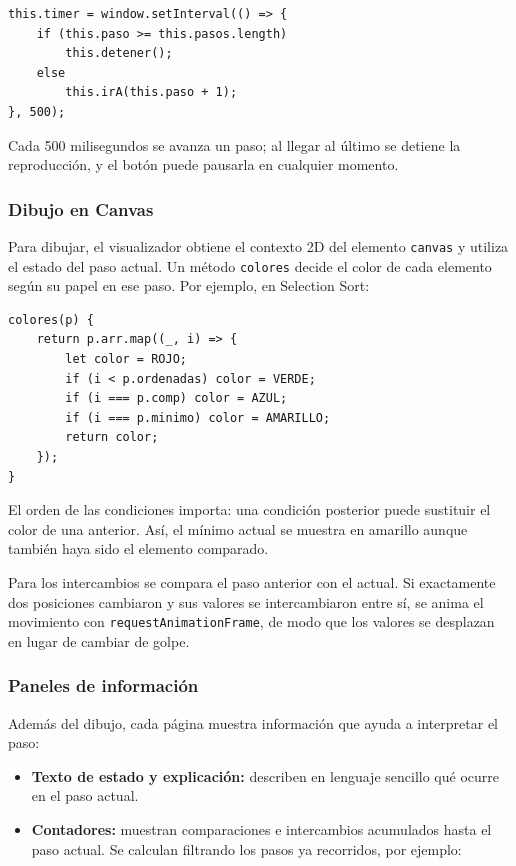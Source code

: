 \documentclass[12pt,a4paper]{article}
\begin{document}
\begin{lstlisting}[caption={Reproducción automática}]
this.timer = window.setInterval(() => {
    if (this.paso >= this.pasos.length)
        this.detener();
    else
        this.irA(this.paso + 1);
}, 500);
\end{lstlisting}

Cada 500 milisegundos se avanza un paso; al llegar al último se detiene la reproducción, y el botón puede pausarla en cualquier momento.

\subsubsection{Dibujo en Canvas}

Para dibujar, el visualizador obtiene el contexto 2D del elemento \texttt{canvas} y utiliza el estado del paso actual. Un método \texttt{colores} decide el color de cada elemento según su papel en ese paso. Por ejemplo, en Selection Sort:

\begin{lstlisting}[caption={Asignación de colores en Selection Sort}]
colores(p) {
    return p.arr.map((_, i) => {
        let color = ROJO;
        if (i < p.ordenadas) color = VERDE;
        if (i === p.comp) color = AZUL;
        if (i === p.minimo) color = AMARILLO;
        return color;
    });
}
\end{lstlisting}

El orden de las condiciones importa: una condición posterior puede sustituir el color de una anterior. Así, el mínimo actual se muestra en amarillo aunque también haya sido el elemento comparado.

Para los intercambios se compara el paso anterior con el actual. Si exactamente dos posiciones cambiaron y sus valores se intercambiaron entre sí, se anima el movimiento con \texttt{requestAnimationFrame}, de modo que los valores se desplazan en lugar de cambiar de golpe.

\subsubsection{Paneles de información}

Además del dibujo, cada página muestra información que ayuda a interpretar el paso:

\begin{itemize}
    \item \textbf{Texto de estado y explicación:} describen en lenguaje sencillo qué ocurre en el paso actual.
    \item \textbf{Contadores:} muestran comparaciones e intercambios acumulados hasta el paso actual. Se calculan filtrando los pasos ya recorridos, por ejemplo:
\end{itemize}
\end{document}
